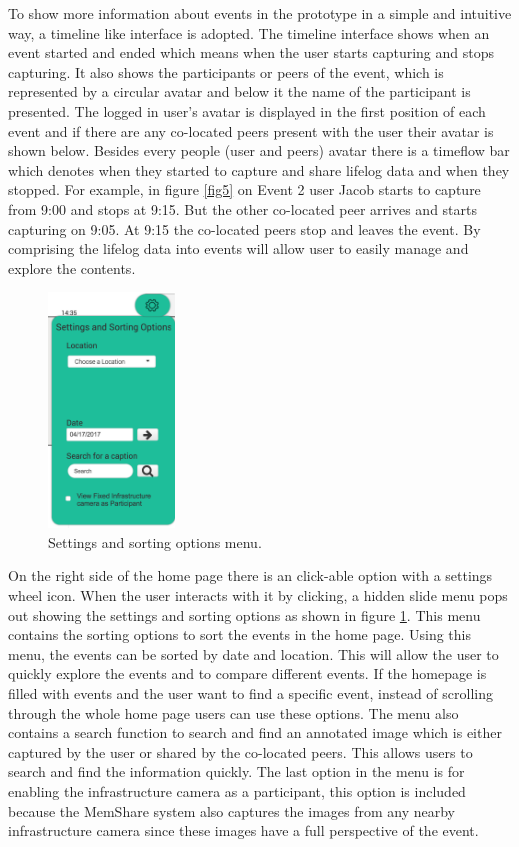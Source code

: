\documentclass[mscthesis]{usiinfthesis}
\begin{document}
To show more information about events in the prototype in a simple and intuitive way, a timeline like interface is adopted. The timeline interface shows when an event started and ended which means when the user starts capturing and stops capturing. It also shows the participants or peers of the event, which is represented by a circular avatar and below it the name of the participant is presented. The logged in user's avatar is displayed in the first position of each event and if there are any co-located peers present with the user their avatar is shown below. Besides every people (user and peers) avatar there is a timeflow bar which denotes when they started to capture and share lifelog data and when they stopped. For example, in figure \ref{fig5} on Event 2 user Jacob starts to capture from 9:00 and stops at 9:15. But the other co-located peer arrives and starts capturing on 9:05. At 9:15 the co-located peers stop and leaves the event. By comprising the lifelog data into events will allow user to easily manage and explore the contents.

\begin{figure}[!ht]
  \centering
  \includegraphics[width=0.3\textwidth]{Sort}
  \caption{Settings and sorting options menu.}
  \label{fig6}
\end{figure}

On the right side of the home page there is an click-able option with a settings wheel icon. When the user interacts with it by clicking, a hidden slide menu pops out showing the settings and sorting options as shown in figure \ref{fig6}. This menu contains the sorting options to sort the events in the home page. Using this menu, the events can be sorted by date and location. This will allow the user to quickly explore the events and to compare different events. If the homepage is filled with events and the user want to find a specific event, instead of scrolling through the whole home page users can use these options. The menu also contains a search function to search and find an annotated image which is either captured by the user or shared by the co-located peers. This allows users to search and find the information quickly. The last option in the menu is for enabling the infrastructure camera as a participant, this option is included because the MemShare system also captures the images from any nearby infrastructure camera since these images have a full perspective of the event. 
\end{document}
